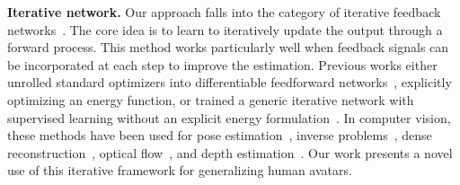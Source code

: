 \textbf{Iterative network.} Our approach falls into the category of iterative feedback networks~\citep{adler2017solving, manhardt2018deep, carreira2016human, li2018deepim, ma2020deep}. 
The core idea is to learn to iteratively update the output through a forward process. This method works particularly well when feedback signals can be incorporated at each step to improve the estimation. Previous works either unrolled standard optimizers into differentiable feedforward networks~\citep{wang2016proximal, belanger2016structured, schwing2015fully, zuo2025ogni}, explicitly optimizing an energy function, or trained a generic iterative network with supervised learning without an explicit energy formulation~\citep{andrychowicz2016learning, wichrowska2017learned, flynn2019deepview, teed2020raft}. In computer vision, these methods have been used for pose estimation~\citep{li2018deepim, carreira2016human}, inverse problems~\citep{ma2020deep}, dense reconstruction~\citep{flynn2019deepview}, optical flow~\citep{teed2020raft}, and depth estimation~\citep{zuo2025ogni}. 
Our work presents a novel use of this iterative framework for generalizing human avatars.